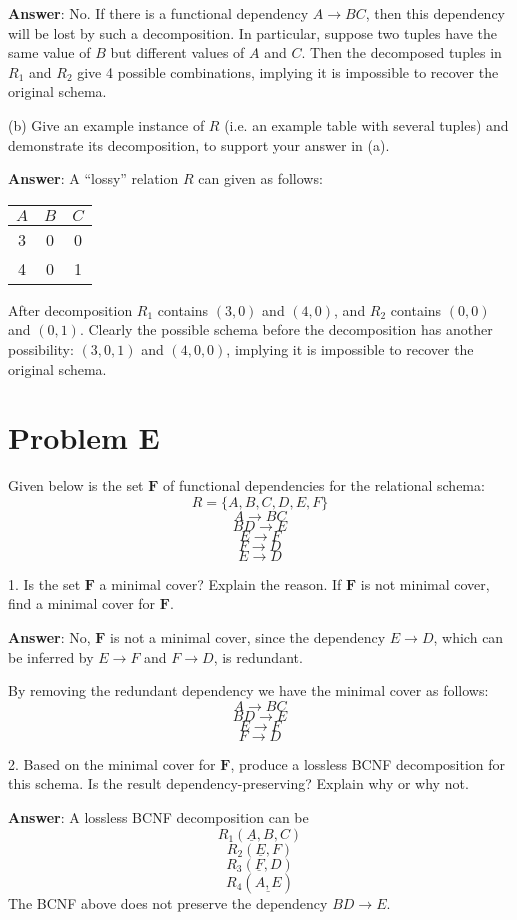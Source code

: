 \documentclass{article}
\begin{document}
{\bf Answer}: No. If there is a functional dependency $A \to BC$, then this dependency will be lost by such a decomposition. In particular, suppose two tuples have the same value of $B$ but different values of $A$ and $C$. Then the decomposed tuples in $R_1$ and $R_2$ give 4 possible combinations, implying it is impossible to recover the original schema.

(b) Give an example instance of $R$ (i.e. an example table with several tuples) and demonstrate its decomposition, to support your answer in (a).

{\bf Answer}: A ``lossy'' relation $R$ can given as follows:

\begin{tabular}{c c c}
$A$ & $B$ & $C$ \\
\hline
3 & 0 & 0 \\
4 & 0 & 1 \\
\end{tabular}

After decomposition $R_1$ contains $(3, 0)$ and $(4, 0)$, and $R_2$ contains $(0, 0)$ and $(0, 1)$.
Clearly the possible schema before the decomposition has another possibility: $(3, 0, 1)$ and $(4, 0, 0)$, implying it is impossible to recover the original schema.

\section{Problem E}
Given below is the set $\mathbf{F}$ of functional dependencies for the relational schema:
$$R = \{A, B, C, D, E, F\}$$
$$A \to BC$$
$$BD \to E$$
$$E \to F$$
$$F \to D$$
$$E \to D$$

1. Is the set $\mathbf{F}$ a minimal cover? Explain the reason. If $\mathbf{F}$ is not minimal cover, find a minimal cover for $\mathbf{F}$.

{\bf Answer}: No, $\mathbf{F}$ is not a minimal cover, since the dependency $E \to D$, which can be inferred by $E \to F$ and $F \to D$, is redundant.

By removing the redundant dependency we have the minimal cover as follows:
$$A \to BC$$
$$BD \to E$$
$$E \to F$$
$$F \to D$$

2. Based on the minimal cover for $\mathbf{F}$, produce a lossless BCNF decomposition for this schema. Is the result dependency-preserving? Explain why or why not.

{\bf Answer}: A lossless BCNF decomposition can be
$$R_1 (\underline{A}, B, C)$$
$$R_2 (\underline{E}, F)$$
$$R_3 (\underline{F}, D)$$
$$R_4 (\underline{A, E})$$
The BCNF above does not preserve the dependency $BD \to E$.
\end{document}
